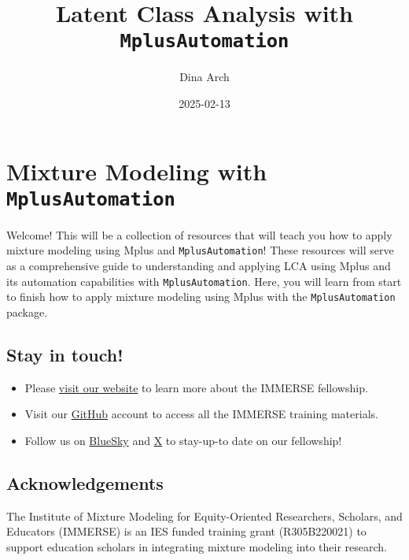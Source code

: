 \documentclass[
]{book}
\title{Latent Class Analysis with \texttt{MplusAutomation}}
\author{Dina Arch}
\date{2025-02-13}
\begin{document}
\maketitle

{
\setcounter{tocdepth}{1}
\tableofcontents
}
\chapter*{\texorpdfstring{Mixture Modeling with \texttt{MplusAutomation}}{Mixture Modeling with MplusAutomation}}\label{mixture-modeling-with-mplusautomation}

Welcome! This will be a collection of resources that will teach you how to apply mixture modeling using Mplus\citep{muthen2017} and \texttt{MplusAutomation}\citep{hallquist2018}! These resources will serve as a comprehensive guide to understanding and applying LCA using Mplus and its automation capabilities with \texttt{MplusAutomation}. Here, you will learn from start to finish how to apply mixture modeling using Mplus with the \texttt{MplusAutomation} package.

\section*{Stay in touch!}\label{stay-in-touch}

\begin{itemize}
\item
  Please \href{https://immerse.education.ucsb.edu/}{visit our website} to learn more about the IMMERSE fellowship.
\item
  Visit our \href{https://github.com/immerse-ucsb}{GitHub} account to access all the IMMERSE training materials.
\item
  Follow us on \href{https://bsky.app/profile/immerse-ucsb.bsky.social}{BlueSky} and \href{https://twitter.com/IMMERSE_UCSB}{X} to stay-up-to date on our fellowship!
\end{itemize}

\section*{Acknowledgements}\label{acknowledgements}

The Institute of Mixture Modeling for Equity-Oriented Researchers, Scholars, and Educators (IMMERSE) is an IES funded training grant (R305B220021) to support education scholars in integrating mixture modeling into their research.
\end{document}
